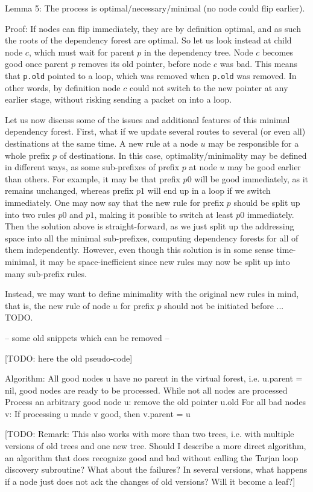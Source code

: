 Lemma 5: The process is optimal/necessary/minimal (no node could flip earlier).

Proof: If nodes can flip immediately, they are by definition optimal, and as such the roots of the dependency forest are optimal. So let us look instead at child node $c$, which must wait for parent $p$ in the dependency tree. Node $c$ becomes good once parent $p$ removes its old pointer, before node $c$ was bad. This means that \texttt{p.old} pointed to a loop, which was removed when \texttt{p.old} was removed. In other words, by definition node $c$ could not switch to the new pointer at any earlier stage, without risking sending a packet on into a loop.

Let us now discuss some of the issues and additional features of this minimal dependency forest. First, what if we update several routes to several (or even all) destinations at the same time. A new rule at a node $u$ may be responsible for a whole prefix $p$ of destinations. In this case, optimality/minimality may be defined in different ways, as some sub-prefixes of prefix $p$ at node $u$ may be good earlier than others. For example, it may be that prefix $p0$ will be good immediately, as it remains unchanged, whereas prefix $p1$ will end up in a loop if we switch immediately. One may now say that the new rule for prefix $p$ should be split up into two rules $p0$ and $p1$, making it possible to switch at least $p0$ immediately. Then the solution above is straight-forward, as we just split up the addressing space into all the minimal sub-prefixes, computing dependency forests for all of them independently. However, even though this solution is in some sense time-minimal, it may be space-inefficient since new rules may now be split up into many sub-prefix rules.

Instead, we may want to define minimality with the original new rules in mind, that is, the new rule of node $u$ for prefix $p$ should not be initiated before ... TODO.




-- some old snippets which can be removed --

[TODO: here the old pseudo-code]

Algorithm:
All good nodes u have no parent in the virtual forest, i.e. u.parent = nil, good nodes are ready to be processed.
While not all nodes are processed
	Process an arbitrary good node u: remove the old pointer u.old
	For all bad nodes v:
		If processing u made v good, then v.parent = u

[TODO: Remark: This also works with more than two trees, i.e. with multiple versions of old trees and one new tree. Should I describe a more direct algorithm, an algorithm that does recognize good and bad without calling the Tarjan loop discovery subroutine? What about the failures? In several versions, what happens if a node just does not ack the changes of old versions? Will it become a leaf?]


